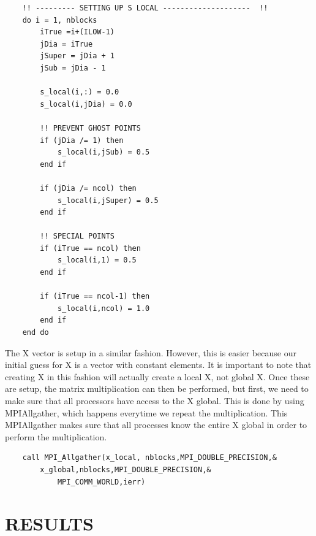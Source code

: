 \documentclass[12pt]{article}
\begin{document}
    \begin{lstlisting}
    !! --------- SETTING UP S LOCAL --------------------  !!
    do i = 1, nblocks
        iTrue =i+(ILOW-1) 
        jDia = iTrue
        jSuper = jDia + 1
        jSub = jDia - 1
        
        s_local(i,:) = 0.0
        s_local(i,jDia) = 0.0

        !! PREVENT GHOST POINTS
        if (jDia /= 1) then 
            s_local(i,jSub) = 0.5
        end if 

        if (jDia /= ncol) then 
            s_local(i,jSuper) = 0.5
        end if 

        !! SPECIAL POINTS
        if (iTrue == ncol) then
            s_local(i,1) = 0.5
        end if

        if (iTrue == ncol-1) then
            s_local(i,ncol) = 1.0
        end if
    end do        
    \end{lstlisting}
    \noindent
    The X vector is setup in a similar fashion. However, this is easier because our initial guess for X is a vector with constant elements. It is important to note that creating X in this fashion will actually create a local X, not global X. Once these are setup, the matrix multiplication can then be performed, but first, we need to make sure that all processors have access to the X global. This is done by using MPIAllgather, which happens everytime we repeat the multiplication. This MPIAllgather makes sure that all processes know the entire X global in order to perform the multiplication. 

    \begin{lstlisting}
    call MPI_Allgather(x_local, nblocks,MPI_DOUBLE_PRECISION,&
        x_global,nblocks,MPI_DOUBLE_PRECISION,&
            MPI_COMM_WORLD,ierr)
    \end{lstlisting}


    \section{RESULTS}
\end{document}

